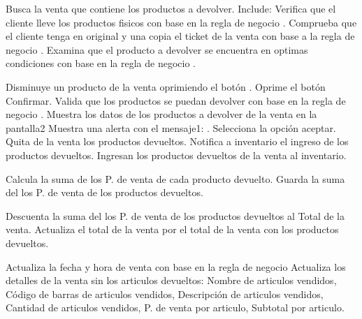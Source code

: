 \begin{UCtrayectoria}

	\UCpaso [\UCactor]  Busca la venta que contiene los productos a devolver. Include: 
	\UCpaso [\UCactor] Verifica que el cliente lleve los productos fisicos con base en la regla de negocio  .
	\UCpaso [\UCactor] Comprueba que el cliente tenga en original y una copia el ticket de la venta con base a la regla de negocio  . 
\UCpaso [\UCactor] Examina que el producto a devolver se encuentra en optimas condiciones con base en la regla de negocio . 


	\UCpaso [\UCactor] Disminuye un producto de la venta oprimiendo el botón \cdtButton{-}.
	\UCpaso [\UCactor] Oprime el botón Confirmar. 
	\UCpaso [\UCsist] Valida que los productos se puedan devolver con base en la regla de negocio . 
	\UCpaso [\UCsist] Muestra los datos de los productos a devolver de la venta en la pantalla2 
	\UCpaso [\UCsist] Muestra una alerta con el mensaje1: .
	\UCpaso [\UCactor] Selecciona la opción aceptar.  
	\UCpaso [\UCsist] Quita de la venta los productos devueltos.
	\UCpaso [\UCsist] Notifica a inventario el ingreso de los productos devueltos.
	\UCpaso [\UCsist] Ingresan los productos devueltos de la venta al inventario.

	\UCpaso [\UCsist] Calcula la suma de los  P. de venta de cada producto devuelto.
	\UCpaso [\UCsist] Guarda la suma del los P. de venta de los productos devueltos.

	
	\UCpaso[\UCsist] Descuenta la suma del  los P. de venta de los productos devueltos al Total de la venta.
	\UCpaso [\UCsist] Actualiza el total de la venta por el total de la venta con los productos devueltos.
	
	\UCpaso [\UCsist] Actualiza la fecha y hora de venta con base en la regla de negocio 
	\UCpaso [\UCsist] Actualiza los detalles de la venta sin los articulos devueltos: Nombre de articulos vendidos, Código de barras de articulos vendidos, Descripción de articulos vendidos, Cantidad de articulos vendidos, P. de venta por articulo, Subtotal por articulo.
	

\end{UCtrayectoria}
